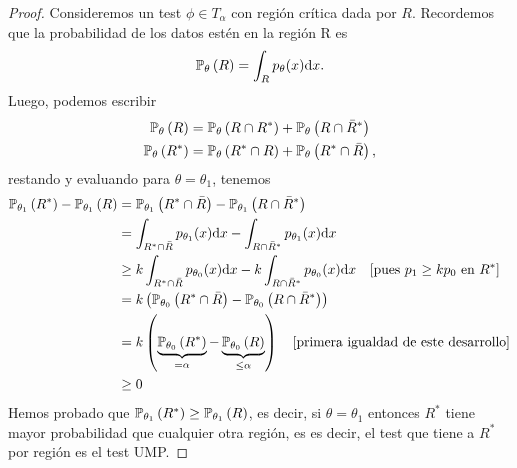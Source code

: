 \begin{proof}
	Consideremos un test $\phi\in T_\alpha$ con región crítica dada por $R$. Recordemos que  la probabilidad de los datos estén en la región R es 
	\begin{equation}
		\mathbb{P}_\theta \left(R\right) = \int_R p_\theta(x){\text{d}x}.
	\end{equation}
	Luego, podemos escribir 
	\begin{align}
		\mathbb{P}_\theta \left(R\right) &= \mathbb{P}_\theta \left(R\cap R^*\right) + \mathbb{P}_\theta \left(R\cap \bar{R}^*\right)\\
		\mathbb{P}_\theta \left(R^*\right) &= \mathbb{P}_\theta \left(R^*\cap R\right) + \mathbb{P}_\theta \left(R^*\cap \bar{R}\right),
	\end{align}
	restando y evaluando para $\theta=\theta_1$, tenemos
	\begin{align}
		\Probtu{R^*} - \Probtu{R} 	&=  \Probtu{R^*\cap \bar{R}} - \Probtu{R\cap \bar{R}^*}\nonumber \\
									&=  \int_{R^*\cap \bar{R}} p_{\theta_1}(x)\dx - \int_{R\cap \bar{R}^*} p_{\theta_1}(x)\dx \nonumber\\
									&\geq  k\int_{R^*\cap \bar{R}} p_{\theta_0}(x)\dx - k\int_{R\cap \bar{R}^*} p_{\theta_0}(x)\dx \quad[\text{pues } p_1\geq k p_0 \text{ en } R^*]\nonumber\\
									&= k\left( \Probtz{R^*\cap \bar{R}} - \Probtz{R\cap \bar{R}^*}\right)\nonumber \\
									&= k\left( \underbrace{\Probtz{R^*}}_{=\alpha} - \underbrace{\Probtz{R}}_{\leq\alpha}\right) \quad[\text{primera igualdad de este desarrollo}]\nonumber\\
									&\geq 0
	\end{align}
	Hemos probado que $\mathbb{P}_{\theta_1} \left(R^*\right) \geq \mathbb{P}_{\theta_1} \left(R\right)$, es decir, si $\theta = \theta_1$ entonces $R^*$ tiene mayor probabilidad que cualquier otra región, es es decir, el test que tiene a $R^*$ por región es el test UMP.

	
\end{proof}


